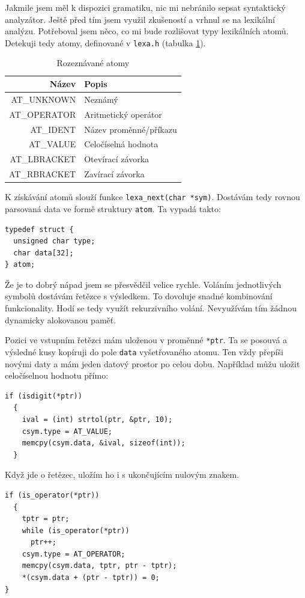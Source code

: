 \documentclass{article}
\begin{document}
Jakmile jsem měl k dispozici gramatiku, nic mi nebránilo sepsat
syntaktický analyzátor. Ještě před tím jsem využil zkušeností a vrhnul
se na lexikální analýzu.  Potřeboval jsem něco, co mi bude rozlišovat
typy lexikálních atomů. Detekuji tedy atomy, definované v
\texttt{lexa.h} (tabulka \ref{tab:atom}).

\begin{table}
\centering
\begin{tabular}{|r|l|}
\hline
Název & Popis\\ \hline\hline
AT\_UNKNOWN & Neznámý\\ \hline
AT\_OPERATOR & Aritmetický operátor\\ \hline
AT\_IDENT & Název proměnné/příkazu\\ \hline
AT\_VALUE & Celočíselná hodnota\\ \hline
AT\_LBRACKET & Otevírací závorka\\ \hline
AT\_RBRACKET & Zavírací závorka\\
\hline
\end{tabular}
\caption{Rozeznávané atomy}
\label{tab:atom}
\end{table}

K získávání atomů slouží funkce \verb+lexa_next(char *sym)+.  Dostávám
tedy rovnou parsovaná data ve formě struktury \texttt{atom}.  Ta
vypadá takto:
\begin{lstlisting}
typedef struct {
  unsigned char type;
  char data[32];
} atom;
\end{lstlisting}

Že je to dobrý nápad jsem se přesvědčil velice rychle. Voláním
jednotlivých symbolů dostávám řetězce s výsledkem. To dovoluje
snadné kombinování funkcionality. Hodí se tedy využít rekurzivního
volání. Nevyužívám tím žádnou dynamicky alokovanou paměť.

Pozici ve vstupním řetězci mám uloženou v proměnné \texttt{*ptr}.
Ta se posouvá a výsledné kusy kopíruji do pole \texttt{data}
vyšetřovaného atomu. Ten vždy přepíši novými daty a mám
jeden datový prostor po celou dobu. Například můžu uložit celočíselnou
hodnotu přímo:

\begin{lstlisting}
if (isdigit(*ptr))
  {
    ival = (int) strtol(ptr, &ptr, 10);
    csym.type = AT_VALUE;
    memcpy(csym.data, &ival, sizeof(int));
  }
\end{lstlisting}

Když jde o řetězec, uložím ho i s ukončujícím nulovým znakem.

\begin{lstlisting}
if (is_operator(*ptr))
  {
    tptr = ptr;
    while (is_operator(*ptr))
      ptr++;
    csym.type = AT_OPERATOR;
    memcpy(csym.data, tptr, ptr - tptr);
    *(csym.data + (ptr - tptr)) = 0;
}
\end{lstlisting}
\end{document}
